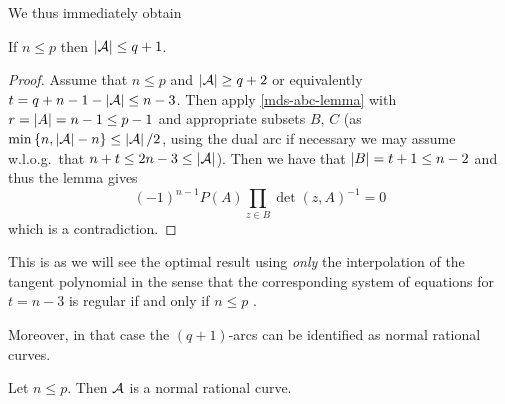 We thus immediately obtain

\begin{corollary}\label{mds-bound-n-leq-p}
  If $n\leq p$ then $\left\vert{\mathcal{A}}\right\vert\leq q+1$.
\end{corollary}

\begin{proof}
  Assume that $n\leq p$ and $\left\vert{\mathcal{A}}\right\vert\geq q+2$ or equivalently $t=q+n-1-\left\vert{\mathcal{A}}\right\vert\leq
  n-3$. Then apply \autoref{mds-abc-lemma} with
  $r=\left\vert{A}\right\vert=n-1\leq p-1$ and appropriate subsets $B$, $C$ (as $\min\set{n,\card{\cA}-n}\leq\card{\cA}/2$, using the dual arc  if necessary we may assume w.l.o.g.\ that $n+t\leq 2n-3\leq\left\vert{\mathcal{A}}\right\vert$). Then
  we have that $\left\vert{B}\right\vert=t+1\leq n-2$ and thus the lemma gives
  $$
    {(-1)}^{n-1}P(A)\prod_{z\in B}{{\det(z,A)}^{-1}}=0
  $$
  which is a contradiction.
\end{proof}

\begin{remark}
    This is as we will see the optimal result using \emph{only} the interpolation
    of the tangent polynomial in the sense that the corresponding system of equations for $t=n-3$ is regular if and only if $n\leq p$ .  %
\end{remark}

Moreover, in that case the $(q+1)$-arcs can be identified as normal rational
curves.

\begin{corollary}\label{mds-class-n-leq-p}
    Let $n\leq p$. Then $\mathcal{A}$ is a normal rational curve.
\end{corollary}

